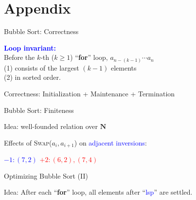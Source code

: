 \appendix

\section{Appendix}

\begin{frame}{Bubble Sort: Correctness}
  \begin{center}
  \end{center}

  \begin{center}
	\textcolor{blue}{\bf Loop invariant:\\[3pt]} 
	Before the $k$-th {\small ($k \ge 1$)} ``{\bf for}'' loop, $a_{n-(k-1)} \cdots a_{n}$ \\
	(1) consists of the largest $(k-1)$ elements \\
	(2) in sorted order. 
  \end{center}

  \begin{center}
	Correctness: Initialization + Maintenance + Termination
  \end{center}
\end{frame}
\begin{frame}{Bubble Sort: Finiteness}
  \begin{center}
	Idea: well-founded relation over $\mathbf{N}$
  \end{center}

  Effects of \textsc{Swap}{($a_{i}, a_{i+1}$)} on \textcolor{blue}{adjacent inversions}:

  \pause
  \begin{center}
	\textcolor{blue}{$-1: (7,2)$} \pause \qquad\qquad \textcolor{red}{$+2: (6,2), (7,4)$}
  \end{center}
\end{frame}
\begin{frame}{Optimizing Bubble Sort (II)}

  Idea: After each ``{\bf for}'' loop, all elements after ``\textcolor{blue}{lsp}'' are settled.

  
\end{frame}
